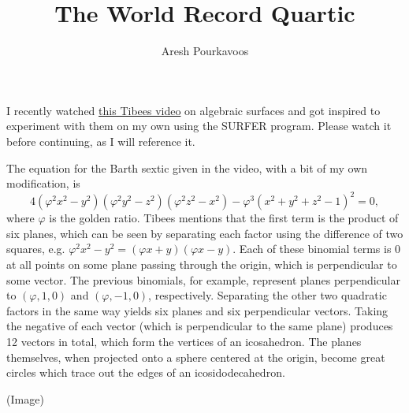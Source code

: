 \documentclass{article}
\begin{document}
\title{The World Record Quartic}
\author{Aresh Pourkavoos}
\maketitle

I recently watched \href{https://youtu.be/UVfR9u1TGW0}{this Tibees video} on algebraic surfaces
and got inspired to experiment with them on my own using the SURFER program.
Please watch it before continuing, as I will reference it.

The equation for the Barth sextic given in the video, with a bit of my own modification, is
$$4(\varphi^2x^2-y^2)(\varphi^2y^2-z^2)(\varphi^2z^2-x^2)-\varphi^3(x^2+y^2+z^2-1)^2=0,$$
where $\varphi$ is the golden ratio.
Tibees mentions that the first term is the product of six planes,
which can be seen by separating each factor using the difference of two squares,
e.g. $\varphi^2x^2-y^2 = (\varphi x+y)(\varphi x-y)$.
Each of these binomial terms is 0 at all points on some plane passing through the origin,
which is perpendicular to some vector.
The previous binomials, for example, represent planes
perpendicular to $(\varphi, 1, 0)$ and $(\varphi, -1, 0)$, respectively.
Separating the other two quadratic factors in the same way yields
six planes and six perpendicular vectors.
Taking the negative of each vector (which is perpendicular to the same plane)
produces 12 vectors in total, which form the vertices of an icosahedron.
The planes themselves, when projected onto a sphere centered at the origin,
become great circles which trace out the edges of an icosidodecahedron.

(Image)
\end{document}
